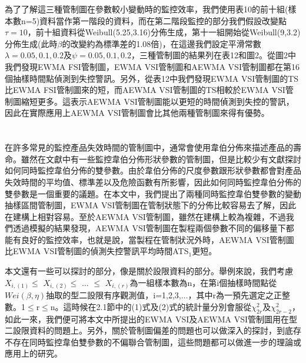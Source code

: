 \documentclass[12pt]{article}  %
\theoremstyle{plain}
\begin{document}
為了了解這三種管制圖在參數較小變動時的監控效率，我們使用表10的前十組(樣本數n=5)資料當作第一階段的資料，而在第二階段監控的部分我們假設改變點$\tau=10$，前十組資料從Weibull(5.25,3.16)分佈生成，第十一組開始從Weibull(9,3.2)分佈生成(此時$\beta$的改變約為標準差的1.08倍)，在這邊我們設定平滑常數$\lambda=0.05,0.1,0.2$及$\psi=0.05,0.1,0.2$，三種管制圖的結果列在表12和圖2。從圖2中我們發現EWMA FSI管制圖，EWMA VSI管制圖和AEWMA VSI管制圖都在第16個抽樣時間點偵測到失控警訊。另外，從表12中我們發現EWMA VSI管制圖的TS比EWMA FSI管制圖來的短，而AEWMA VSI管制圖的TS相較於EWMA VSI管制圖縮短更多。這表示AEWMA VSI管制圖能以更短的時間偵測到失控的警訊，因此在實際應用上AEWMA VSI管制圖會比其他兩種管制圖來得有優勢。




\newpage
\section{}
在許多常見的監控產品失效時間的管制圖中，通常會使用韋伯分佈來描述產品的壽命。雖然在文獻中有一些監控韋伯分佈形狀參數的管制圖，但是比較少有文獻探討如何同時監控韋伯分佈的雙參數。由於韋伯分佈的尺度參數跟形狀參數都會對產品失效時間的平均值、標準差以及危險函數有所影響，因此如何同時監控韋伯分佈的雙參數是一個重要的議題。在本文中，我們提出了兩種同時監控韋伯雙參數的變動抽樣區間管制圖，EWMA VSI管制圖在管制狀態下的分佈比較容易去了解，因此在建構上相對容易。至於AEWMA VSI管制圖，雖然在建構上較為複雜，不過我們透過模擬的結果發現，AEWMA VSI管制圖在製程兩個參數不同的偏移量下都能有良好的監控效率，也就是說，當製程在管制狀況外時，AEWMA VSI管制圖比EWMA VSI管制圖的偵測失控警訊平均時間ATS$_1$更短。

本文還有一些可以探討的部分，像是關於設限資料的部分。舉例來說，我們考慮$X_{i,\left( 1\right)}\leq$ $X_{i,\left( 2\right)}\leq$ $\ldots$ $\leq$ $X_{i,\left( r\right)}$為一組樣本數為n，在第i個抽樣時間點從$Wei(\beta,\eta)$抽取的型二設限有序觀測值，i=1,2,3,$\ldots$，其中r為一預先選定之正整數。1$\leq$r$\leq$n。這時候在2.1節中的(1)式及(2)式的統計量分別會服從$\chi^2_{2r}$及$\chi^2_{2r-2}$，如此一來，我們便可將本文中所提出的EWMA VSI及AEWMA VSI管制圖用在型二設限資料的問題上。另外，關於管制圖偏差的問題也可以做深入的探討，到底存不存在同時監控韋伯雙參數的不偏聯合管制圖，這些問題都可以做進一步的理論或應用上的研究。


  \newpage
\end{document}
